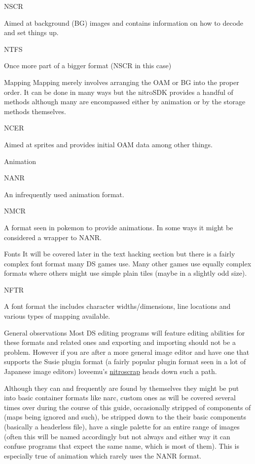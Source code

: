 \documentclass[
]{book}
\begin{document}
NSCR

Aimed at background (BG) images and contains information on how to decode and set things up.

NTFS

Once more part of a bigger format (NSCR in this case)

Mapping Mapping merely involves arranging the OAM or BG into the proper order. It can be done in many ways but the nitroSDK provides a handful of methods although many are encompassed either by animation or by the storage methods themselves.

NCER

Aimed at sprites and provides initial OAM data among other things.

Animation

NANR

An infrequently used animation format.

NMCR

A format seen in pokemon to provide animations. In some ways it might be considered a wrapper to NANR.

Fonts It will be covered later in the text hacking section but there is a fairly complex font format many DS games use. Many other games use equally complex formats where others might use simple plain tiles (maybe in a slightly odd size).

NFTR

A font format the includes character widths/dimensions, line locations and various types of mapping available.

General observations Most DS editing programs will feature editing abilities for these formats and related ones and exporting and importing should not be a problem. However if you are after a more general image editor and have one that supports the Susie plugin format (a fairly popular plugin format seen in a lot of Japanese image editors) loveemu's \href{https://github.com/loveemu/nitroscrap/releases}{nitroscrap} heads down such a path.

Although they can and frequently are found by themselves they might be put into basic container formats like narc, custom ones as will be covered several times over during the course of this guide, occasionally stripped of components of (maps being ignored and such), be stripped down to the their basic components (basically a headerless file), have a single palette for an entire range of images (often this will be named accordingly but not always and either way it can confuse programs that expect the same name, which is most of them). This is especially true of animation which rarely uses the NANR format.
\end{document}
